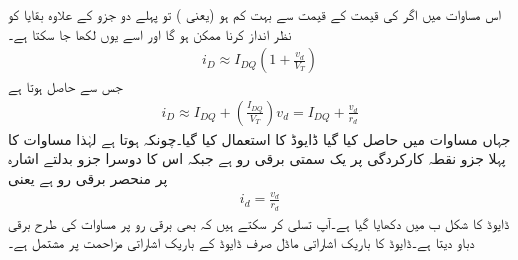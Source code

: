 اس مساوات میں اگر   کی قیمت  کے قیمت سے بہت کم ہو (یعنی ) تو پہلے دو جزو کے علاوہ بقایا کو نظر انداز کرنا ممکن ہو گا اور اسے یوں لکھا جا سکتا ہے۔
\begin{align}
i_D \approx I_{DQ} \left (1+\frac{v_d}{V_T} \right )
\end{align}
جس سے حاصل ہوتا ہے
\begin{align} \label{مساوات_ڈایوڈ_یکسمتی_اور_بدلتا_رو}
i_D \approx I_{DQ} +\left( \frac{I_{DQ}}{V_T} \right ) v_d = I_{DQ}+\frac{v_d}{r_d}
\end{align}
جہاں مساوات  میں حاصل کیا گیا ڈایوڈ کا   استعمال کیا گیا۔چونکہ  ہوتا ہے لہٰذا مساوات   کا پہلا جزو نقطہ کارکردگی پر یک سمتی برقی رو  ہے جبکہ اس کا دوسرا جزو بدلتے اشارہ   پر منحصر برقی رو  ہے یعنی
\begin{align} \label{مساوات_ڈایوڈ_باریک_ماڈل_کا_حصول}
i_d = \frac{v_d}{r_d}
\end{align}
ڈایوڈ کا   شکل  ب میں دکھایا گیا ہے۔آپ تسلی کر سکتے ہیں کہ  بھی برقی رو  پر  مساوات  کی طرح برقی دباو   دیتا ہے۔ڈایوڈ کا باریک اشاراتی ماڈل صرف ڈایوڈ کے باریک اشاراتی مزاحمت  پر مشتمل ہے۔


